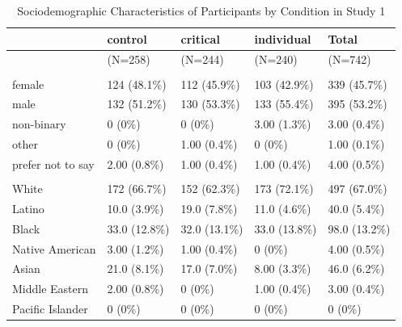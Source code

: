 \documentclass[
]{book}
\begin{document}
\begin{table}

\caption{\label{tab:demos-table-s1}Sociodemographic Characteristics of Participants by Condition in Study 1}
\centering
\begin{tabular}[t]{lllll}
\toprule
  & control & critical & individual & Total\\
\midrule
 & (N=258) & (N=244) & (N=240) & (N=742)\\
\addlinespace[0.3em]
\multicolumn{5}{l}{\textbf{Gender}}\\
\hspace{1em}female & 124 (48.1\%) & 112 (45.9\%) & 103 (42.9\%) & 339 (45.7\%)\\
\hspace{1em}male & 132 (51.2\%) & 130 (53.3\%) & 133 (55.4\%) & 395 (53.2\%)\\
\hspace{1em}non-binary & 0 (0\%) & 0 (0\%) & 3.00 (1.3\%) & 3.00 (0.4\%)\\
\hspace{1em}other & 0 (0\%) & 1.00 (0.4\%) & 0 (0\%) & 1.00 (0.1\%)\\
\hspace{1em}prefer not to say & 2.00 (0.8\%) & 1.00 (0.4\%) & 1.00 (0.4\%) & 4.00 (0.5\%)\\
\addlinespace[0.3em]
\multicolumn{5}{l}{\textbf{Racial/ethnic Identity}}\\
\hspace{1em}White & 172 (66.7\%) & 152 (62.3\%) & 173 (72.1\%) & 497 (67.0\%)\\
\hspace{1em}Latino & 10.0 (3.9\%) & 19.0 (7.8\%) & 11.0 (4.6\%) & 40.0 (5.4\%)\\
\hspace{1em}Black & 33.0 (12.8\%) & 32.0 (13.1\%) & 33.0 (13.8\%) & 98.0 (13.2\%)\\
\hspace{1em}Native American & 3.00 (1.2\%) & 1.00 (0.4\%) & 0 (0\%) & 4.00 (0.5\%)\\
\hspace{1em}Asian & 21.0 (8.1\%) & 17.0 (7.0\%) & 8.00 (3.3\%) & 46.0 (6.2\%)\\
\hspace{1em}Middle Eastern & 2.00 (0.8\%) & 0 (0\%) & 1.00 (0.4\%) & 3.00 (0.4\%)\\
\hspace{1em}Pacific Islander & 0 (0\%) & 0 (0\%) & 0 (0\%) & 0 (0\%)\\

\end{tabular}
\end{table}
\end{document}
